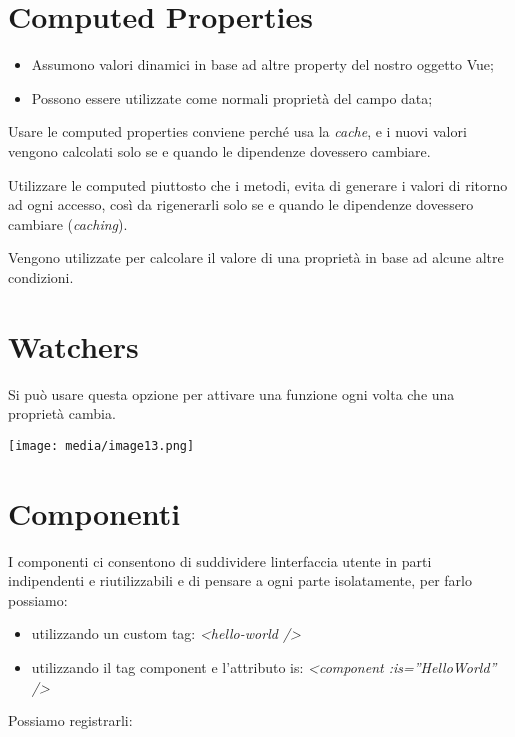 \section{Computed Properties}\label{computed-properties}

\begin{itemize}
\item
  Assumono valori dinamici in base ad altre property del nostro oggetto
  Vue;
\item
  Possono essere utilizzate come normali proprietà del campo data;
\end{itemize}

Usare le computed properties conviene perché usa la \emph{cache}, e i
nuovi valori vengono calcolati solo se e quando le dipendenze dovessero
cambiare.

Utilizzare le computed piuttosto che i metodi, evita di generare i
valori di ritorno ad ogni accesso, così da rigenerarli solo se e quando
le dipendenze dovessero cambiare (\emph{caching}).

Vengono utilizzate per calcolare il valore di una proprietà in base ad
alcune altre condizioni.

\section{Watchers}\label{watchers}

Si può usare questa opzione per attivare una funzione ogni volta che una
proprietà cambia.

\texttt{[image: media/image13.png]}

\section{Componenti}\label{componenti}

I componenti ci consentono di suddividere l\textquotesingle interfaccia
utente in parti indipendenti e riutilizzabili e di pensare a ogni parte
isolatamente, per farlo possiamo:

\begin{itemize}
\item
  utilizzando un custom tag: \emph{\textless hello-world
  /\textgreater{}}
\item
  utilizzando il tag component e l'attributo is:
  \emph{\textless component :is=''HelloWorld'' /\textgreater{}}
\end{itemize}

Possiamo registrarli:


